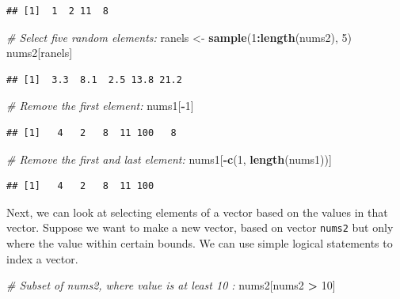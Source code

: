 \documentclass[]{book}
\newenvironment{Shaded}{\begin{snugshade}}{\end{snugshade}}
\newcommand{\CommentTok}[1]{\textcolor[rgb]{0.56,0.35,0.01}{\textit{#1}}}
\newcommand{\DecValTok}[1]{\textcolor[rgb]{0.00,0.00,0.81}{#1}}
\newcommand{\KeywordTok}[1]{\textcolor[rgb]{0.13,0.29,0.53}{\textbf{#1}}}
\newcommand{\NormalTok}[1]{#1}
\newcommand{\OperatorTok}[1]{\textcolor[rgb]{0.81,0.36,0.00}{\textbf{#1}}}
\newcommand{\StringTok}[1]{\textcolor[rgb]{0.31,0.60,0.02}{#1}}
\begin{document}
\begin{verbatim}
## [1]  1  2 11  8
\end{verbatim}

\begin{Shaded}
\begin{Highlighting}[]
\CommentTok{# Select five random elements:}
\NormalTok{ranels <-}\StringTok{ }\KeywordTok{sample}\NormalTok{(}\DecValTok{1}\OperatorTok{:}\KeywordTok{length}\NormalTok{(nums2), }\DecValTok{5}\NormalTok{)}
\NormalTok{nums2[ranels]}
\end{Highlighting}
\end{Shaded}

\begin{verbatim}
## [1]  3.3  8.1  2.5 13.8 21.2
\end{verbatim}

\begin{Shaded}
\begin{Highlighting}[]
\CommentTok{# Remove the first element:}
\NormalTok{nums1[}\OperatorTok{-}\DecValTok{1}\NormalTok{]}
\end{Highlighting}
\end{Shaded}

\begin{verbatim}
## [1]   4   2   8  11 100   8
\end{verbatim}

\begin{Shaded}
\begin{Highlighting}[]
\CommentTok{# Remove the first and last element:}
\NormalTok{nums1[}\OperatorTok{-}\KeywordTok{c}\NormalTok{(}\DecValTok{1}\NormalTok{, }\KeywordTok{length}\NormalTok{(nums1))]}
\end{Highlighting}
\end{Shaded}

\begin{verbatim}
## [1]   4   2   8  11 100
\end{verbatim}

Next, we can look at selecting elements of a vector based on the values in that vector. Suppose we want to make a new vector, based on vector \texttt{nums2} but only where the value within certain bounds. We can use simple logical statements to index a vector.

\begin{Shaded}
\begin{Highlighting}[]
\CommentTok{# Subset of nums2, where value is at least 10 :}
\NormalTok{nums2[nums2 }\OperatorTok{>}\StringTok{ }\DecValTok{10}\NormalTok{]}
\end{Highlighting}
\end{Shaded}
\end{document}

